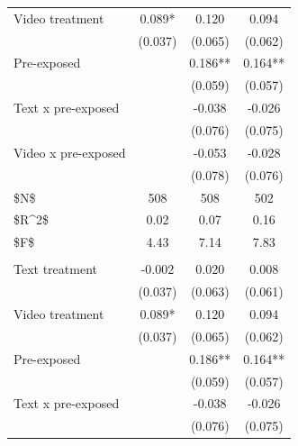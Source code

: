 \documentclass[
  11pt,
  oneside]{article}
\begin{document}
\begin{table}
\begin{threeparttable}
\begin{tabular}[t]{lccc}
\hspace{1em}Video treatment & 0.089* & 0.120 & \vphantom{1} 0.094\\
\hspace{1em} & (0.037) & (0.065) & \vphantom{1} (0.062)\\
\hspace{1em}Pre-exposed &  & 0.186** & \vphantom{1} 0.164**\\
\hspace{1em} &  & (0.059) & \vphantom{1} (0.057)\\
\hspace{1em}Text x pre-exposed &  & -0.038 & \vphantom{1} -0.026\\
\hspace{1em} &  & (0.076) & \vphantom{1} (0.075)\\
\hspace{1em}Video x pre-exposed &  & -0.053 & \vphantom{1} -0.028\\
\hspace{1em} &  & (0.078) & \vphantom{1} (0.076)\\
\hspace{1em}\$N\$ & 508 & 508 & \vphantom{1} 502\\
\hspace{1em}\$R\textasciicircum{}2\$ & 0.02 & 0.07 & \vphantom{1} 0.16\\
\hspace{1em}\$F\$ & 4.43 & 7.14 & \vphantom{1} 7.83\\
\addlinespace[0.5em]
\multicolumn{4}{l}{\textit{Outcome: recommend employer}}\\
\midrule \hspace{1em}Text treatment & -0.002 & 0.020 & 0.008\\
\hspace{1em} & (0.037) & (0.063) & (0.061)\\
\hspace{1em}Video treatment & 0.089* & 0.120 & 0.094\\
\hspace{1em} & (0.037) & (0.065) & (0.062)\\
\hspace{1em}Pre-exposed &  & 0.186** & 0.164**\\
\hspace{1em} &  & (0.059) & (0.057)\\
\hspace{1em}Text x pre-exposed &  & -0.038 & -0.026\\
\hspace{1em} &  & (0.076) & (0.075)\\

\end{tabular}
\end{threeparttable}
\end{table}
\end{document}
